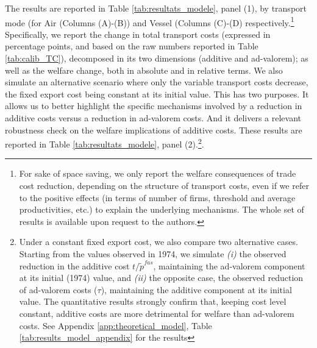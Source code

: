 \documentclass[a4paper,11pt]{article}
\begin{document}
The results are reported in Table \ref{tab:resultats_modele}, panel (1), by transport mode (for Air (Columns (A)-(B)) and Vessel (Columns (C)-(D) respectively.\footnote{For sake of space saving, we only report the welfare consequences of trade cost reduction, depending on the structure of transport costs, even if we refer to the positive effects (in terms of number of firms, threshold and average productivities, etc.) to explain the underlying mechanisms. The whole set of results is available upon request to the authors.} Specifically, we report the change in total transport costs (expressed in percentage points, and based on the raw numbers reported in Table \ref{tab:calib_TC}), decomposed in its two dimensions (additive and ad-valorem); as well as the welfare change, both in absolute and in relative terms.
We also simulate an alternative scenario where only the variable transport costs decrease, the fixed export cost being constant at its initial value. This has two purposes. It allows us to better highlight the specific mechanisms involved by a reduction in additive costs versus a reduction in ad-valorem costs. And it delivers a relevant robustness check on the welfare implications of additive costs. These results are reported in Table \ref{tab:resultats_modele}, panel (2).\footnote{Under a constant fixed export cost, we also compare two alternative cases. Starting from the values observed in 1974, we simulate \textit{(i)} the observed reduction in the additive cost $t/\widetilde{p}^{fas}$, maintaining the ad-valorem component at its initial (1974) value, and  \textit{(ii)} the opposite case, the observed reduction of ad-valorem costs ($\tau$), maintaining the additive component at its initial value. The quantitative results strongly confirm that, keeping cost level constant, additive costs are more detrimental for welfare than ad-valorem costs.
See Appendix \ref{app:theoretical_model}, Table \ref{tab:results_model_appendix} for the results}.
\end{document}
